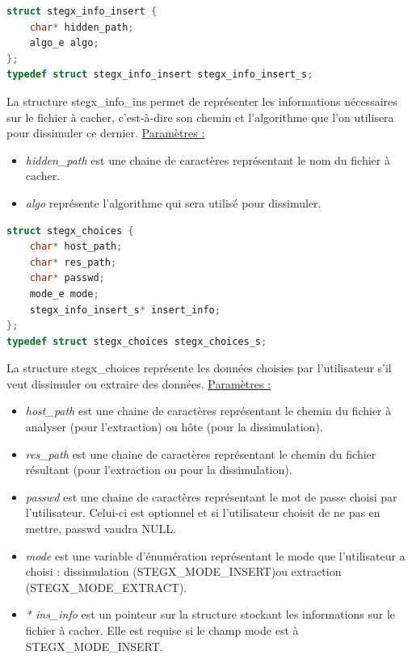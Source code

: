 \documentclass[11pt]{article}
\begin{document}
\begin{lstlisting}[language=c]
struct stegx_info_insert {
    char* hidden_path;
    algo_e algo;
};
typedef struct stegx_info_insert stegx_info_insert_s;
\end{lstlisting}

La structure stegx\_info\_ins permet de représenter les informations 
nécessaires sur le fichier à cacher, c'est-à-dire son chemin et l'algorithme que 
l'on utilisera pour dissimuler ce dernier. \newline
\underline{Paramètres :}
\begin{itemize}
\item \textit{hidden\_path} est une chaine de caractères représentant le nom du fichier 
à cacher. 
\item \textit{algo} représente l'algorithme qui sera utilisé pour dissimuler. 
\newline
\end{itemize}

\begin{lstlisting}[language=c]
struct stegx_choices {
    char* host_path;
    char* res_path;                         
    char* passwd;                           
    mode_e mode;                        
    stegx_info_insert_s* insert_info;             
};
typedef struct stegx_choices stegx_choices_s;
\end{lstlisting}

La structure stegx\_choices représente les données choisies par l'utilisateur 
s'il veut dissimuler ou extraire des données. \newline
\underline{Paramètres :}
\begin{itemize}
\item \textit{host\_path} est une chaine de caractères représentant le chemin
du fichier à analyser (pour l'extraction) ou hôte (pour la dissimulation). 
\item \textit{res\_path} est une chaine de caractères représentant le chemin
du fichier résultant (pour l'extraction ou pour la dissimulation). 
\item \textit{passwd} est une chaine de caractères représentant le mot de passe 
choisi par l'utilisateur. Celui-ci est optionnel et si l'utilisateur choisit 
de ne pas en mettre, passwd vaudra NULL. 
\item \textit{mode} est une variable d'énumération représentant le mode que 
l'utilisateur a choisi : dissimulation (STEGX\_MODE\_INSERT)ou extraction 
(STEGX\_MODE\_EXTRACT).  
\item \textit{* ins\_info} est un pointeur sur la structure stockant les informations 
sur le fichier à cacher. Elle est requise si le champ mode est à STEGX\_MODE\_INSERT. 
\newline
\end{itemize}
\end{document}
